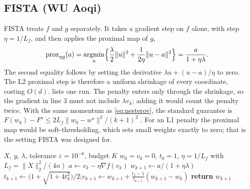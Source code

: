 \documentclass{article}
\newcommand{\prox}{\operatorname{prox}}
\newcommand{\argmin}{\operatorname*{argmin}}
\begin{document}
\subsection{FISTA (WU Aoqi)}
\label{sec:fista}
FISTA treats $f$ and $g$ separately. It takes a gradient step on $f$ alone, with step $\eta=1/L_f$, and then applies the proximal map of $g$,
\begin{equation}
\prox_{\eta g}(a)=\argmin_{u}\Bigl\{\frac{\lambda}{2}\|u\|^2+\frac{1}{2\eta}\|u-a\|^2\Bigr\}=\frac{a}{1+\eta\lambda}.
\end{equation}
The second equality follows by setting the derivative $\lambda u+(u-a)/\eta$ to zero. The L2 proximal step is therefore a uniform shrinkage of every coordinate, costing $O(d)$.  lists one run. The penalty enters only through the shrinkage, so the gradient in line 3 must not include $\lambda v_k$; adding it would count the penalty twice. With the same momentum as \eqref{eq:nesterov}, the standard guarantee is $F(w_k)-F^\star\le 2L_f\|w_0-w^\star\|^2/(k+1)^2$ \citep{beck2009fista}. For an L1 penalty the proximal map would be soft-thresholding, which sets small weights exactly to zero; that is the setting FISTA was designed for.

\begin{algorithm}[t]
\caption{FISTA for L2-regularized logistic regression (as implemented)}
\label{alg:fista}
\begin{algorithmic}[1]
\Require $X$, $y$, $\lambda$, tolerance $\varepsilon=10^{-6}$, budget $K$
\State $w_0=v_0=0$, $t_0=1$, $\eta=1/L_f$ with $L_f=\|X\|_2^2/(4n)$
  \State $a\gets v_k-\eta\nabla f(v_k)$ 
  \State $w_{k+1}\gets a/(1+\eta\lambda)$ 
  \State $t_{k+1}\gets\bigl(1+\sqrt{1+4t_k^2}\bigr)/2$;\quad $v_{k+1}\gets w_{k+1}+\frac{t_k-1}{t_{k+1}}(w_{k+1}-w_k)$
   \textbf{return} $w_{k+1}$ \EndIf
\EndFor
\end{algorithmic}
\end{algorithm}
\end{document}
